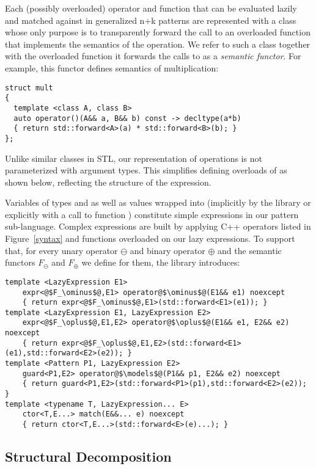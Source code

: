 Each (possibly overloaded) operator and function that can be evaluated lazily 
and matched against in generalized n+k patterns are represented with a class whose 
only purpose is to transparently forward the call to an overloaded function that 
implements the semantics of the operation. We refer to such a class together with 
the overloaded function it forwards the calls to as a \emph{semantic functor}.
For example, this functor defines semantics of multiplication:

\begin{lstlisting}[keepspaces,columns=flexible]
struct mult 
{
  template <class A, class B> 
  auto operator()(A&& a, B&& b) const -> decltype(a*b) 
  { return std::forward<A>(a) * std::forward<B>(b); }   
};
\end{lstlisting}

\noindent
Unlike similar classes in STL, our representation of operations is not 
parameterized with argument types. This simplifies defining overloads of 
 as shown below, reflecting the structure of the 
expression.

Variables of types  and  as well as values 
wrapped into  (implicitly by the library or explicitly with a 
call to function ) constitute simple expressions in our pattern 
sub-language. Complex expressions are built by applying C++ operators 
listed in Figure~\ref{syntax} and functions overloaded on our lazy expressions. 
To support that, for every unary operator $\ominus$ and binary operator $\oplus$ 
and the semantic functors $F_\ominus$ and $F_\oplus$ we define for them, the 
library introduces:

\begin{lstlisting}[keepspaces]
template <LazyExpression E1>
    expr<@$F_\ominus$@,E1> operator@$\ominus$@(E1&& e1) noexcept 
    { return expr<@$F_\ominus$@,E1>(std::forward<E1>(e1)); }
template <LazyExpression E1, LazyExpression E2>
    expr<@$F_\oplus$@,E1,E2> operator@$\oplus$@(E1&& e1, E2&& e2) noexcept 
    { return expr<@$F_\oplus$@,E1,E2>(std::forward<E1>(e1),std::forward<E2>(e2)); }
template <Pattern P1, LazyExpression E2>
    guard<P1,E2> operator@$\models$@(P1&& p1, E2&& e2) noexcept 
    { return guard<P1,E2>(std::forward<P1>(p1),std::forward<E2>(e2)); }
template <typename T, LazyExpression... E>
    ctor<T,E...> match(E&&... e) noexcept 
    { return ctor<T,E...>(std::forward<E>(e)...); }
\end{lstlisting}

\subsection{Structural Decomposition}
\label{sec:bnd}

